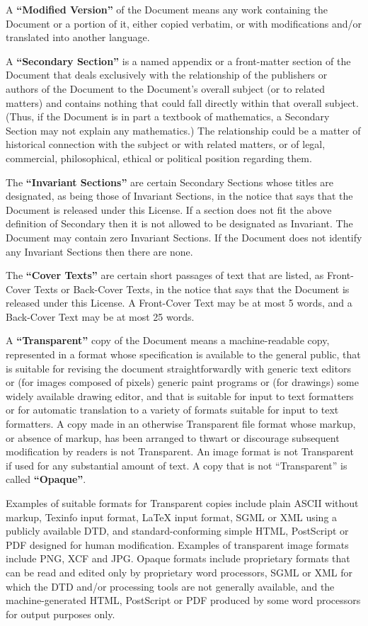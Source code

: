 \documentclass[a4paper,12pt,english]{sphinxmanual}
\begin{document}
A \textbf{``Modified Version''} of the Document means any work containing the
Document or a portion of it, either copied verbatim, or with
modifications and/or translated into another language.

A \textbf{``Secondary Section''} is a named appendix or a front-matter section
of the Document that deals exclusively with the relationship of the
publishers or authors of the Document to the Document’s overall subject
(or to related matters) and contains nothing that could fall directly
within that overall subject. (Thus, if the Document is in part a
textbook of mathematics, a Secondary Section may not explain any
mathematics.) The relationship could be a matter of historical
connection with the subject or with related matters, or of legal,
commercial, philosophical, ethical or political position regarding them.

The \textbf{``Invariant Sections''} are certain Secondary Sections whose titles
are designated, as being those of Invariant Sections, in the notice that
says that the Document is released under this License. If a section does
not fit the above definition of Secondary then it is not allowed to be
designated as Invariant. The Document may contain zero Invariant
Sections. If the Document does not identify any Invariant Sections then
there are none.

The \textbf{``Cover Texts''} are certain short passages of text that are
listed, as Front-Cover Texts or Back-Cover Texts, in the notice that
says that the Document is released under this License. A Front-Cover
Text may be at most 5 words, and a Back-Cover Text may be at most 25
words.

A \textbf{``Transparent''} copy of the Document means a machine-readable copy,
represented in a format whose specification is available to the general
public, that is suitable for revising the document straightforwardly
with generic text editors or (for images composed of pixels) generic
paint programs or (for drawings) some widely available drawing editor,
and that is suitable for input to text formatters or for automatic
translation to a variety of formats suitable for input to text
formatters. A copy made in an otherwise Transparent file format whose
markup, or absence of markup, has been arranged to thwart or discourage
subsequent modification by readers is not Transparent. An image format
is not Transparent if used for any substantial amount of text. A copy
that is not ``Transparent'' is called \textbf{``Opaque''}.

Examples of suitable formats for Transparent copies include plain ASCII
without markup, Texinfo input format, LaTeX input format, SGML or XML
using a publicly available DTD, and standard-conforming simple HTML,
PostScript or PDF designed for human modification. Examples of
transparent image formats include PNG, XCF and JPG. Opaque formats
include proprietary formats that can be read and edited only by
proprietary word processors, SGML or XML for which the DTD and/or
processing tools are not generally available, and the machine-generated
HTML, PostScript or PDF produced by some word processors for output
purposes only.
\end{document}
